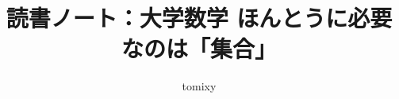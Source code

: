 \documentclass[b5paper,17pt,twocolumn]{jsarticle}
\title{読書ノート：大学数学 ほんとうに必要なのは「集合」}
\author{tomixy}
\begin{document}
\maketitle
\tableofcontents

\br








\newpage
\listoftodos
\end{document}
